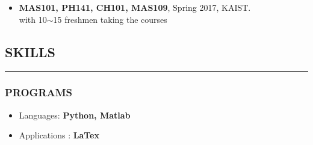 \documentclass[10pt,a4]{article}
\begin{document}
\begin{small}
\begin{itemize}
\item {\bf MAS101, PH141, CH101, MAS109}, Spring 2017, KAIST. \\
with 10$\sim$15 freshmen taking the courses


\end{itemize}







\lhead{\textcolor{gray}{\it Junghyun Lee}}
\fancyfoot[C]{}

\subsection*{SKILLS}
\hrule
\vspace{0.2cm}

\subsubsection*{PROGRAMS}

\begin{itemize}
	\item Languages: \textbf{Python, Matlab %
	}
	\item Applications : \textbf{LaTex}
\end{itemize}


\end{small}
\end{document}
